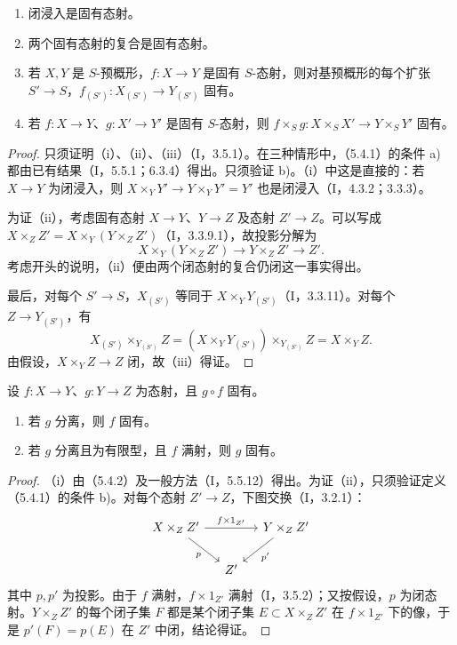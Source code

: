 \begin{enumerate}[label=\textup{(\roman*)}]
\item 闭浸入是固有态射。
\item 两个固有态射的复合是固有态射。
\item 若 $X,Y$ 是 $S$-预概形，$f:X\to Y$ 是固有 $S$-态射，则对基预概形的每个扩张 $S'\to S$，$f_{(S')}:X_{(S')}\to Y_{(S')}$ 固有。
\item 若 $f:X\to Y$、$g:X'\to Y'$ 是固有 $S$-态射，则
$f\times_Sg:X\times_S X'\to Y\times_S Y'$ 固有。
\end{enumerate}
\begin{proof}
只须证明（i）、（ii）、（iii）（I，3.5.1）。在三种情形中，（5.4.1）的条件 a) 都由已有结果（I，5.5.1；6.3.4）得出。只须验证 b)。（i）中这是直接的：若 $X\to Y$ 为闭浸入，则
$X\times_Y Y'\to Y\times_Y Y'=Y'$ 也是闭浸入（I，4.3.2；3.3.3）。

为证（ii），考虑固有态射 $X\to Y$、$Y\to Z$ 及态射 $Z'\to Z$。可以写成
$X\times_Z Z'=X\times_Y(Y\times_Z Z')$（I，3.3.9.1），故投影分解为
\[
X\times_Y(Y\times_Z Z')\longrightarrow Y\times_Z Z'\longrightarrow Z'.
\]
考虑开头的说明，（ii）便由两个闭态射的复合仍闭这一事实得出。

最后，对每个 $S'\to S$，$X_{(S')}$ 等同于 $X\times_Y Y_{(S')}$（I，3.3.11）。对每个 $Z\to Y_{(S')}$，有
\[
X_{(S')}\times_{Y_{(S')}}Z
=(X\times_Y Y_{(S')})\times_{Y_{(S')}}Z
=X\times_Y Z.
\]
由假设，$X\times_Y Z\to Z$ 闭，故（iii）得证。
\end{proof}

设 $f:X\to Y$、$g:Y\to Z$ 为态射，且 $g\circ f$ 固有。
\begin{enumerate}[label=\textup{(\roman*)}]
\item 若 $g$ 分离，则 $f$ 固有。
\item 若 $g$ 分离且为有限型，且 $f$ 满射，则 $g$ 固有。
\end{enumerate}
\begin{proof}
（i）由（5.4.2）及一般方法（I，5.5.12）得出。为证（ii），只须验证定义（5.4.1）的条件 b)。对每个态射 $Z'\to Z$，下图交换（I，3.2.1）：
\[
\begin{tikzcd}[column sep=small]
X\times_Z Z' \arrow[rr,"f\times1_{Z'}"] \arrow[dr,"p"'] &&Y\times_Z Z'\arrow[dl,"p'"]\\
&Z'&
\end{tikzcd}
\]
其中 $p,p'$ 为投影。由于 $f$ 满射，$f\times1_{Z'}$ 满射（I，3.5.2）；又按假设，$p$ 为闭态射。$Y\times_Z Z'$ 的每个闭子集 $F$ 都是某个闭子集 $E\subset X\times_Z Z'$ 在 $f\times1_{Z'}$ 下的像，于是
$p'(F)=p(E)$ 在 $Z'$ 中闭，结论得证。
\end{proof}

